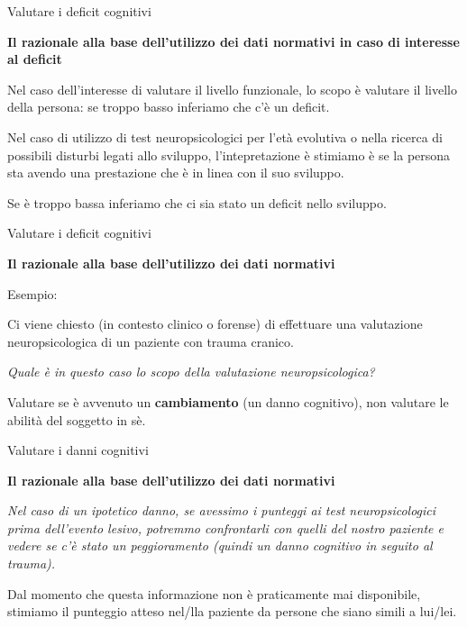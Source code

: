 \documentclass[
  ignorenonframetext,
]{beamer}
\begin{document}
\begin{frame}{Valutare i deficit cognitivi}
\label{valutare-i-deficit-cognitivi-4}
\begin{center}
  \textbf{Il razionale alla base dell’utilizzo dei dati normativi in caso di interesse al deficit}
\end{center}

Nel caso dell'interesse di valutare il livello funzionale, lo scopo è
valutare il livello della persona: se troppo basso inferiamo che c'è un
deficit.

Nel caso di utilizzo di test neuropsicologici per l'età evolutiva o
nella ricerca di possibili disturbi legati allo sviluppo,
l'intepretazione è stimiamo è se la persona sta avendo una prestazione
che è in linea con il suo sviluppo.

Se è troppo bassa inferiamo che ci sia stato un deficit nello sviluppo.
\end{frame}

\begin{frame}{Valutare i deficit cognitivi}
\label{valutare-i-deficit-cognitivi-5}
\begin{center}
  \textbf{Il razionale alla base dell’utilizzo dei dati normativi}
\end{center}

Esempio:

Ci viene chiesto (in contesto clinico o forense) di effettuare una
valutazione neuropsicologica di un paziente con trauma cranico.

\emph{Quale è in questo caso lo scopo della valutazione
neuropsicologica?} \pause

Valutare se è avvenuto un \textbf{cambiamento} (un danno cognitivo), non
valutare le abilità del soggetto in sè.
\end{frame}

\begin{frame}{Valutare i danni cognitivi}
\label{valutare-i-danni-cognitivi}
\begin{center}
  \textbf{Il razionale alla base dell’utilizzo dei dati normativi}
\end{center}

\emph{Nel caso di un ipotetico danno, se avessimo i punteggi ai test
neuropsicologici prima dell'evento lesivo, potremmo confrontarli con
quelli del nostro paziente e vedere se c'è stato un peggioramento
(quindi un danno cognitivo in seguito al trauma).}

Dal momento che questa informazione non è praticamente mai disponibile,
stimiamo il punteggio atteso nel/lla paziente da persone che siano
simili a lui/lei.
\end{frame}
\end{document}
